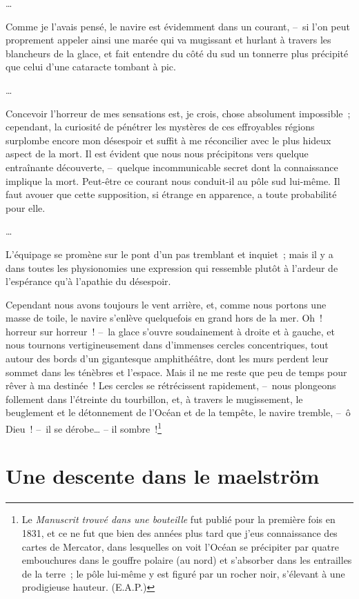 \documentclass[french,twoside]{book} %
\begin{document}
…\par
\noindent Comme je l’avais pensé, le navire est évidemment dans un courant, – si l’on peut proprement appeler ainsi une marée qui va mugissant et hurlant à travers les blancheurs de la glace, et fait entendre du côté du sud un tonnerre plus précipité que celui d’une cataracte tombant à pic.\par
…\par
\noindent Concevoir l’horreur de mes sensations est, je crois, chose absolument impossible ; cependant, la curiosité de pénétrer les mystères de ces effroyables régions surplombe encore mon désespoir et suffit à me réconcilier avec le plus hideux aspect de la mort. Il est évident que nous nous précipitons vers quelque entraînante découverte, – quelque incommunicable secret dont la connaissance implique la mort. Peut-être ce courant nous conduit-il au pôle sud lui-même. Il faut avouer que cette supposition, si étrange en apparence, a toute probabilité pour elle.\par
…\par
\noindent L’équipage se promène sur le pont d’un pas tremblant et inquiet ; mais il y a dans toutes les physionomies une expression qui ressemble plutôt à l’ardeur de l’espérance qu’à l’apathie du désespoir.\par
Cependant nous avons toujours le vent arrière, et, comme nous portons une masse de toile, le navire s’enlève quelquefois en grand hors de la mer. Oh ! horreur sur horreur ! – la glace s’ouvre soudainement à droite et à gauche, et nous tournons vertigineusement dans d’immenses cercles concentriques, tout autour des bords d’un gigantesque amphithéâtre, dont les murs perdent leur sommet dans les ténèbres et l’espace. Mais il ne me reste que peu de temps pour rêver à ma destinée ! Les cercles se rétrécissent rapidement, – nous plongeons follement dans l’étreinte du tourbillon, et, à travers le mugissement, le beuglement et le détonnement de l’Océan et de la tempête, le navire tremble, – ô Dieu ! – il se dérobe… – il sombre !\footnote{Le \emph{Manuscrit trouvé dans une bouteille} fut publié pour la première fois en 1831, et ce ne fut que bien des années plus tard que j’eus connaissance des cartes de Mercator, dans lesquelles on voit l’Océan se précipiter par quatre embouchures dans le gouffre polaire (au nord) et s’absorber dans les entrailles de la terre ; le pôle lui-même y est figuré par un rocher noir, s’élevant à une prodigieuse hauteur. (E.A.P.)}
\section[{Une descente dans le maelström}]{Une descente dans le maelström}\renewcommand{\leftmark}{Une descente dans le maelström}
\end{document}
